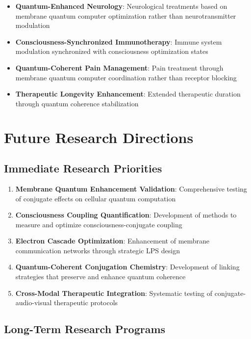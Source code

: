 \documentclass[12pt,a4paper]{article}
\begin{document}
\begin{itemize}
\item \textbf{Quantum-Enhanced Neurology}: Neurological treatments based on membrane quantum computer optimization rather than neurotransmitter modulation
\item \textbf{Consciousness-Synchronized Immunotherapy}: Immune system modulation synchronized with consciousness optimization states
\item \textbf{Quantum-Coherent Pain Management}: Pain treatment through membrane quantum computer coordination rather than receptor blocking
\item \textbf{Therapeutic Longevity Enhancement}: Extended therapeutic duration through quantum coherence stabilization
\end{itemize}

\section{Future Research Directions}

\subsection{Immediate Research Priorities}

\begin{enumerate}
\item \textbf{Membrane Quantum Enhancement Validation}: Comprehensive testing of conjugate effects on cellular quantum computation
\item \textbf{Consciousness Coupling Quantification}: Development of methods to measure and optimize consciousness-conjugate coupling
\item \textbf{Electron Cascade Optimization}: Enhancement of membrane communication networks through strategic LPS design
\item \textbf{Quantum-Coherent Conjugation Chemistry}: Development of linking strategies that preserve and enhance quantum coherence
\item \textbf{Cross-Modal Therapeutic Integration}: Systematic testing of conjugate-audio-visual therapeutic protocols
\end{enumerate}

\subsection{Long-Term Research Programs}
\end{document}
